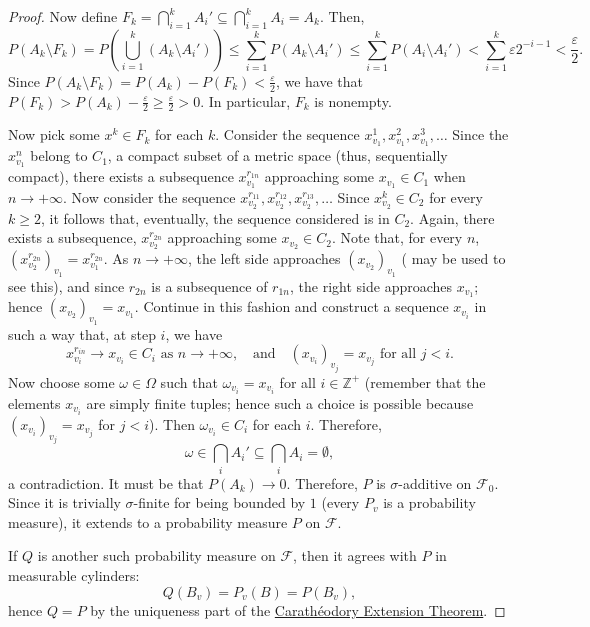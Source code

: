\begin{proof}
Now define \(F_k=\bigcap_{i=1}^kA_i'\subseteq\bigcap_{i=1}^k A_i=A_k\). Then,
\[
		P(A_k\setminus F_k)=P\left(\bigcup_{i=1}^k(A_k\setminus A_i')\right)\leq\sum_{i=1}^{k}P\left(A_k\setminus A_i'\right)\leq\sum_{i=1}^{k} P(A_i\setminus A_i')<\sum_{i=1}^{k} \varepsilon 2^{-i-1}<\frac{\varepsilon}{2}
.\]
Since \(P(A_k\setminus F_k)=P(A_k)-P(F_k)<\frac{\varepsilon}{2}\), we have that \(P(F_k)>P(A_k)-\frac{\varepsilon}{2}\geq \frac{\varepsilon}{2}>0\). In particular, \(F_k\) is nonempty.

Now pick some \(x^k\in F_k\) for each \(k\). Consider the sequence \(x^1_{v_1},x^2_{v_1},x^3_{v_1},\dots\) Since the \(x^n_{v_1}\) belong to \(C_1\), a compact subset of a metric space (thus, sequentially compact), there exists a subsequence \(x_{v_1}^{r_{1n}}\) approaching some \(x_{v_1}\in C_1\) when \(n\to+\infty\). Now consider the sequence \(x_{v_2}^{r_{11}},x_{v_2}^{r_{12}},x_{v_2}^{r_{13}},\dots\) Since \(x^k_{v_2}\in C_2\) for every \(k\geq 2\), it follows that, eventually, the sequence considered is in \(C_2\). Again, there exists a subsequence, \(x_{v_2}^{r_{2n}}\) approaching some \(x_{v_2}\in C_2\). Note that, for every \(n\), \(\left(x_{v_2}^{r_{2n}}\right)_{v_1}=x_{v_1}^{r_{2n}}\). As \(n\to+\infty\), the left side approaches \(\left(x_{v_2}\right)_{v_1}\) ( may be used to see this), and since \(r_{2n}\) is a subsequence of \(r_{1n}\), the right side approaches \(x_{v_1}\); hence \(\left(x_{v_2}\right)_{v_1}=x_{v_1}\).
Continue in this fashion and construct a sequence \(x_{v_i}\) in such a way that, at step \(i\), we have
\[
		x_{v_i}^{r_{in}}\to x_{v_i}\in C_i \text{ as }n\to+\infty, ~~~\text{ and }~~~ \left(x_{v_i}\right)_{v_j}=x_{v_j} \text{ for all } j<i
.\]
Now choose some \(\omega\in\Omega\) such that \(\omega_{v_i}=x_{v_i}\) for all \(i\in\mathbb{Z}^{+}\) (remember that the elements \(x_{v_i}\) are simply finite tuples; hence such a choice is possible because \(\left(x_{v_i}\right)_{v_j}=x_{v_j}\) for \(j<i\)). Then \(\omega_{v_i}\in C_{i}\) for each \(i\). Therefore,
\[
		\omega\in\bigcap_{i}A_i'\subseteq\bigcap_{i}A_i=\emptyset
,\]
a contradiction. It must be that \(P(A_k)\to 0\). Therefore, \(P\) is \(\sigma\)-additive on \(\mathcal{F}_0\). Since it is trivially \(\sigma\)-finite for being bounded by \(1\) (every \(P_v\) is a probability measure), it extends to a probability measure \(P\) on \(\mathcal{F}\).

If \(Q\) is another such probability measure on \(\mathcal{F}\), then it agrees with \(P\) in measurable cylinders:
\[
		Q(B_v)=P_v(B)=P(B_v)
,\]
hence \(Q=P\) by the uniqueness part of the \hyperref[theorem:Caratheodory Extension]{Carathéodory Extension Theorem}.
\end{proof}
